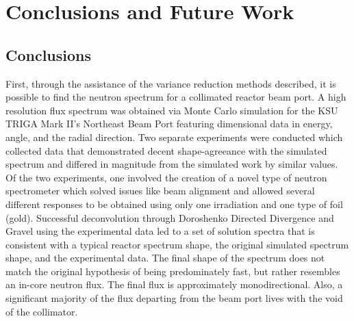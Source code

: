 
\cleardoublepage


\chapter{Conclusions and Future Work}

\section{Conclusions}
First, through the assistance of the variance reduction methods described, it is possible to find the neutron spectrum for a collimated reactor beam port.
A high resolution flux spectrum was obtained via Monte Carlo simulation for the KSU TRIGA Mark II's Northeast Beam Port featuring dimensional data in energy, angle, and the radial direction.
Two separate experiments were conducted which collected data that demonstrated decent shape-agreeance with the simulated spectrum and differed in magnitude from the simulated work by similar values.
Of the two experiments, one involved the creation of a novel type of neutron spectrometer which solved issues like beam alignment and allowed several different responses to be obtained using only one irradiation and one type of foil (gold).
Successful deconvolution through Doroshenko Directed Divergence and Gravel using the experimental data led to a set of solution spectra that is consistent with a typical reactor spectrum shape, the original simulated spectrum shape, and the experimental data.
The final shape of the spectrum does not match the original hypothesis of being predominately fast, but rather resembles an in-core neutron flux.
The final flux is approximately monodirectional.
Also, a significant majority of the flux departing from the beam port lives with the void of the collimator.



